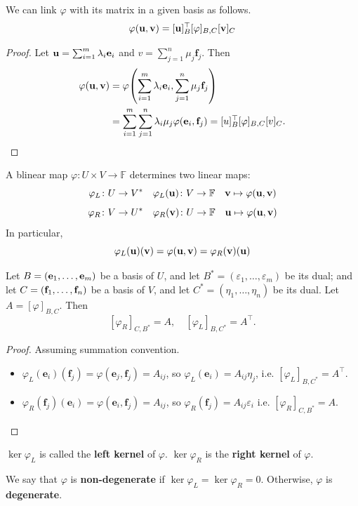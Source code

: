 \documentclass[a4paper]{article}
\renewcommand{\epsilon}{\varepsilon}
\begin{document}
\begin{lemma}
	We can link \( \varphi \) with its matrix in a given basis as follows.
	\[
		\varphi({\bf u},{\bf v}) = [{\bf u}]_B^\top [\varphi]_{B, C} [{\bf v}]_C
	\]
\end{lemma}

\begin{proof}
	Let \( {\bf u} = \sum_{i=1}^m \lambda_i {\bf e}_i \) and \( v = \sum_{j=1}^n \mu_j \mathbf{f}_j \).
	Then
	\begin{align*}
        \varphi({\bf u},{\bf v}) &= \varphi\qty( \sum_{i=1}^m \lambda_i \mathbf{e}_i, \sum_{j=1}^n \mu_j \mathbf{f}_j ) \\ 
        &= \sum_{i=1}^m \sum_{j=1}^n \lambda_i \mu_j \varphi(\mathbf{e}_i,\mathbf{f}_j) = [u]_B^\top [\varphi]_{B,C} [v]_C. \qedhere
    \end{align*}
\end{proof}

\begin{definition}
	A blinear map $ \varphi: U\times V \to \mathbb{F} $ determines two linear maps: 
	\[
		\varphi_L \colon U \to V^* \quad \varphi_L({\bf u}) \colon V \to {\mathbb{F}} \quad {\bf v} \mapsto \varphi({\bf u},{\bf v})
	\]
	\[
		\varphi_R \colon V \to U^* \quad \varphi_R({\bf v}) \colon U \to {\mathbb{F}} \quad {\bf u} \mapsto \varphi({\bf u},{\bf v})
	\]
	In particular,
	\[
		\varphi_L({\bf u})({\bf v}) = \varphi({\bf u},{\bf v}) = \varphi_R({\bf v})({\bf u})
	\]
\end{definition}

\begin{lemma}
	Let \( B = ({\bf e}_1, \dots, {\bf e}_m) \) be a basis of \( U \), and let \( B^* = (\varepsilon_1, \dots, \varepsilon_m) \) be its dual; and let \( C = ({\bf f}_1, \dots, {\bf f}_n) \) be a basis of \( V \), and let \( C^* = (\eta_1, \dots, \eta_n) \) be its dual.
	Let \( A = [\varphi]_{B,C} \).
	Then
	\[
		[\varphi_R]_{C, B^*} = A,\quad [\varphi_L]_{B, C^*} = A^\top.
	\]
\end{lemma}
\begin{proof}
    Assuming summation convention.
    \begin{itemize}
        \item $ \varphi_L(\mathbf{e}_i)(\mathbf{f}_j) = \varphi(\mathbf{e}_j,\mathbf{f}_j) = A_{ij} $, so $ \varphi_L(\mathbf{e}_i) = A_{ij}\eta_j $, i.e. $  [\varphi_L]_{B, C^*} = A^\top $. 
        \item $ \varphi_R(\mathbf{f}_j)(\mathbf{e}_i) = \varphi(\mathbf{e}_i,\mathbf{f}_j) = A_{ij} $, so $ \varphi_R(\mathbf{f}_j) = A_{ij}\epsilon_i $ i.e. $ [\varphi_R]_{C, B^*} = A $. \qedhere
    \end{itemize}
\end{proof}
\begin{definition}
	\( \ker \varphi_L \) is called the \textbf{left kernel} of \( \varphi \).
	\( \ker \varphi_R \) is the \textbf{right kernel} of \( \varphi \).
\end{definition}
\begin{definition}
	We say that \( \varphi \) is \textbf{non-degenerate} if \( \ker \varphi_L = \ker \varphi_R = \qty{0} \).
	Otherwise, \( \varphi \) is \textbf{degenerate}.
\end{definition}
\end{document}
